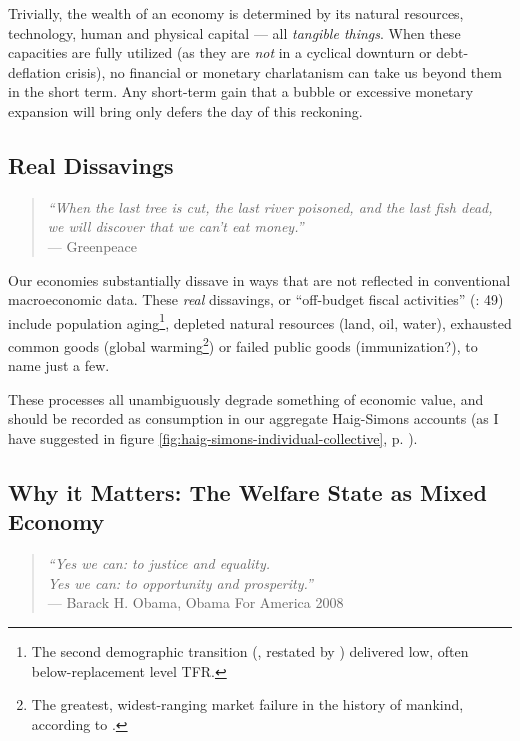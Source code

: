 Trivially, the wealth of an economy is determined by its natural resources, technology, human and physical capital --- all \emph{tangible things}. When these capacities are fully utilized (as they are \emph{not} in a cyclical downturn or debt-deflation crisis), no financial or monetary charlatanism can take us beyond them in the short term. Any short-term gain that a bubble or excessive monetary expansion will bring only defers the day of this reckoning.

\subsection{Real Dissavings} \label{sec:realdissavings}

\begin{quote}
	\emph{``When the last tree is cut, the last river poisoned, and the last fish dead, we will discover that we can't eat money.''\\}
	--- Greenpeace
\end{quote}

Our economies substantially dissave in ways that are not reflected in conventional macroeconomic data. These \emph{real} dissavings, or ``off-budget fiscal activities'' (\citealt{Bonker2006}: 49) include population aging\footnote{
	The second demographic transition (\citealt{Davis1945}, restated by \citealt{Caldwell-1976-aa}) delivered low, often below-replacement level \gls{TFR}.}, 
depleted natural resources (land, oil, water), exhausted common goods (global warming\footnote{
	The greatest, widest-ranging market failure in the history of mankind, according to \cite{Stern-2006-aa}.}) 
or failed public goods (immunization?), to name just a few. 

These processes all unambiguously degrade something of economic value, and should be recorded as consumption in our aggregate Haig-Simons accounts (as I have suggested in figure \ref{fig:haig-simons-individual-collective}, p. \pageref{fig:haig-simons-individual-collective}). %

\subsection[Why it Matters]{Why it Matters: The Welfare State as Mixed Economy} \label{sec:whymixedeconomymatters}

\begin{quote}
	\emph{``Yes we can: to justice and equality.\\ Yes we can: to opportunity and prosperity.''\\}
	--- Barack H. Obama, Obama For America 2008
\end{quote} %

